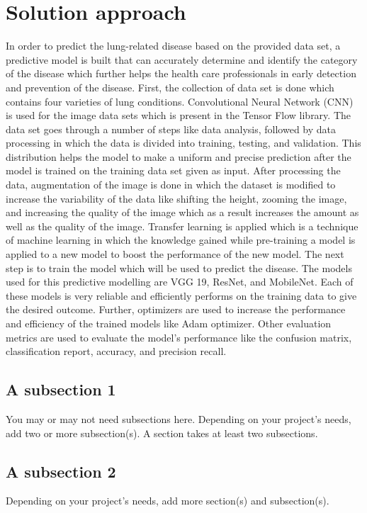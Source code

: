 \section{Solution approach}
\label{sec:intro_sol} %
In order to predict the lung-related disease based on the provided data set, a predictive model is built that can accurately determine and identify the category of the disease which further helps the health care professionals in early detection and prevention of the disease. First, the collection of data set is done which contains four varieties of lung conditions. Convolutional Neural Network (CNN) is used for the image data sets which is present in the Tensor Flow library. The data set goes through a number of steps like data analysis, followed by data processing in which the data is divided into training, testing, and validation. This distribution helps the model to make a uniform and precise prediction after the model is trained on the training data set given as input. After processing the data, augmentation of the image is done in which the dataset is modified to increase the variability of the data like shifting the height, zooming the image, and increasing the quality of the image which as a result increases the amount as well as the quality of the image. Transfer learning is applied which is a technique of machine learning in which the knowledge gained while pre-training a model is applied to a new model to boost the performance of the new model. The next step is to train the model which will be used to predict the disease. The models used for this predictive modelling are VGG 19, ResNet, and MobileNet. Each of these models is very reliable and efficiently performs on the training data to give the desired outcome. Further, optimizers are used to increase the performance and efficiency of the trained models like Adam optimizer. Other evaluation metrics are used to evaluate the model’s performance like the confusion matrix, classification report, accuracy, and precision recall.

\subsection{A subsection 1}
\label{sec:intro_some_sub1}
You may or may not need subsections here. Depending on your project's needs, add two or more subsection(s). A section takes at least two subsections. 

\subsection{A subsection 2}
\label{sec:intro_some_sub2}
Depending on your project's needs, add more section(s) and subsection(s).

